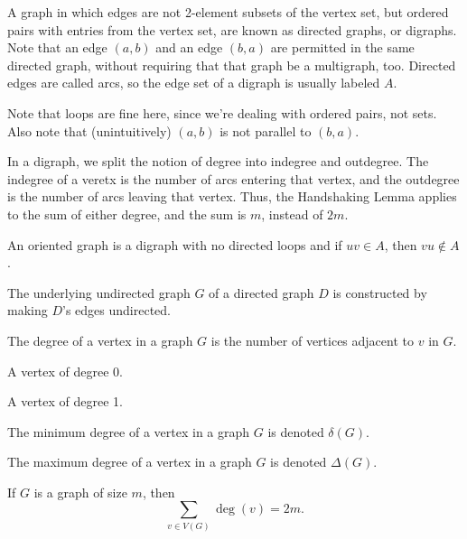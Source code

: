 \documentclass{article}
\begin{document}
\medskip
{}

    A graph in which edges are not 2-element subsets of the vertex set, but ordered pairs with entries from the vertex set, are known as directed graphs, or digraphs. Note that an edge $(a,b)$ and an edge $(b,a)$ are permitted in the same directed graph, without requiring that that graph be a multigraph, too. Directed edges are called arcs, so the edge set of a digraph is usually labeled $A$.

    Note that loops are fine here, since we're dealing with ordered pairs, not sets.
    Also note that (unintuitively) $(a,b)$ is not parallel to $(b,a)$.

    In a digraph, we split the notion of degree into indegree and outdegree. The indegree of a veretx is the number of arcs entering that vertex, and the outdegree is the number of arcs leaving that vertex. Thus, the Handshaking Lemma applies to the sum of either degree, and the sum is $m$, instead of $2m$.

\medskip
{}

    An oriented graph is a digraph with no directed loops and if $uv \in A$, then $vu \notin A$.

\medskip
{}

    The underlying undirected graph $G$ of a directed graph $D$ is constructed by making $D$'s edges undirected.

\medskip
{}

    The degree of a vertex in a graph $G$ is the number of vertices adjacent to $v$ in $G$.

\medskip
{}

    A vertex of degree 0.

\medskip
{}

    A vertex of degree 1.

\medskip
{}

    The minimum degree of a vertex in a graph $G$ is denoted $\delta(G)$.

    The maximum degree of a vertex in a graph $G$ is denoted $\Delta(G)$.

\medskip
{}

    If $G$ is a graph of size $m$, then $$\sum_{v \in V(G)} \deg(v) = 2m.$$
\end{document}
